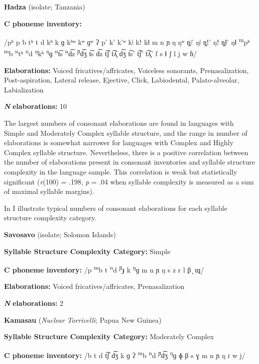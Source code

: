 \ea\label{ex:4.27}
  \textbf{Hadza} (isolate; Tanzania)

\textbf{C phoneme inventory:} 

/pʰ p b tʰ t d kʰ k ɡ kʰʷ kʷ ɡʷ ʔ p’ k’ k’ʷ kǀ kǃ kǁ m n ɲ ŋ ŋʷ ŋ̥ǀ’ ŋǀ ŋ̥ǃ’ ŋǃ ŋ̥ǁ’ ŋǁ \textsuperscript{m}pʰ \textsuperscript{m}b \textsuperscript{n}tʰ \textsuperscript{n}d \textsuperscript{ŋ}kʰ \textsuperscript{ŋ}ɡ \textsuperscript{n}t͡s \textsuperscript{n}d͡z \textsuperscript{ɲ}d͡ʒ t͡s d͡z t͡ʃ t͡ʎ̥ d͡ʒ t͡s’ t͡ʃ’ t͡ʎ̥’ f s ɬ ʃ l j w ɦ/

\textbf{Elaborations:} Voiced fricatives/affricates, Voiceless sonorants, Prenasalization, Post-aspiration, Lateral release, Ejective, Click, Labiodental, Palato-alveolar, Labialization

\textbf{\textit{N}} \textbf{elaborations:} 10
\z

  The largest numbers of consonant elaborations are found in languages with Simple and Moderately Complex syllable structure, and the range in number of elaborations is somewhat narrower for languages with Complex and Highly Complex syllable structure. Nevertheless, there is a positive correlation between the number of elaborations present in consonant inventories and syllable structure complexity in the language sample. This correlation is weak but statistically significant (\textit{r}(100) = .198, \textit{p} = .04 when syllable complexity is measured as a sum of maximal syllable margins).

  In  I illustrate typical numbers of consonant elaborations for each syllable structure complexity category.

\ea\label{ex:4.28}
  \textbf{Savosavo} (isolate; Solomon Islands)

\textbf{Syllable Structure Complexity Category:} Simple

\textbf{C phoneme inventory:} /p \textsuperscript{m}b t \textsuperscript{n}d \textsuperscript{ɲ}ɟ k \textsuperscript{ŋ}ɡ m n ɲ ŋ s z r l β ̞ ɰ/

\textbf{Elaborations:} Voiced fricatives/affricates, Prenasalization

\textbf{\textit{N}} \textbf{elaborations:} 2
\z

\ea\label{ex:4.29}
  \textbf{Kamasau} (\textit{Nuclear Torricelli}; Papua New Guinea)

\textbf{Syllable Structure Complexity Category:} Moderately Complex

\textbf{C phoneme inventory:} /b t d t͡ʃ d͡ʒ k ɡ ʔ \textsuperscript{m}b \textsuperscript{n}d \textsuperscript{ɲ}d͡ʒ \textsuperscript{ŋ}ɡ ɸ β s ɣ m n ɲ ŋ ɾ w j/

